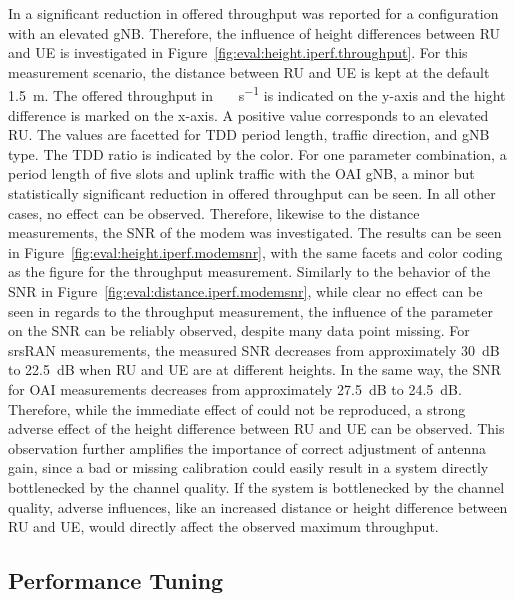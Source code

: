 In \cite{raffeck2024parameterizing} a significant reduction in offered throughput was reported for a configuration with an elevated \gls{gNB}.
Therefore, the influence of height differences between \gls{RU} and \gls{UE} is investigated in Figure~\ref{fig:eval:height.iperf.throughput}.
For this measurement scenario, the distance between \gls{RU} and \gls{UE} is kept at the default \SI{1.5}{\meter}.
The offered throughput in \SI{}{\mega\bit\per\second} is indicated on the y-axis and the hight difference is marked on the x-axis.
A positive value corresponds to an elevated \gls{RU}.
The values are facetted for \gls{TDD} period length, traffic direction, and \gls{gNB} type.
The \gls{TDD} ratio is indicated by the color.
For one parameter combination, a period length of five slots and uplink traffic with the OAI \gls{gNB},
a minor but statistically significant reduction in offered throughput can be seen.
In all other cases, no effect can be observed.
Therefore, likewise to the distance measurements, the \gls{SNR} of the modem was investigated.
The results can be seen in Figure~\ref{fig:eval:height.iperf.modemsnr}, with the same facets and color coding as the figure for the throughput measurement.
Similarly to the behavior of the \gls{SNR} in Figure~\ref{fig:eval:distance.iperf.modemsnr},
while clear no effect can be seen in regards to the throughput measurement,
the influence of the parameter on the \gls{SNR} can be reliably observed, despite many data point missing.
For srsRAN measurements, the measured \gls{SNR} decreases from approximately \SI{30}{\deci\bel} to \SI{22.5}{\deci\bel} when \gls{RU} and \gls{UE} are at different heights.
In the same way, the \gls{SNR} for OAI measurements decreases from approximately \SI{27.5}{\deci\bel} to \SI{24.5}{\deci\bel}.
Therefore, while the immediate effect of \cite{raffeck2024parameterizing} could not be reproduced, a strong adverse effect of the
height difference between \gls{RU} and \gls{UE} can be observed.
This observation further amplifies the importance of correct adjustment of antenna gain,
since a bad or missing calibration could easily result in a system directly bottlenecked by the channel quality.
If the system is bottlenecked by the channel quality, adverse influences, like an increased distance or height difference
between \gls{RU} and \gls{UE}, would directly affect the observed maximum throughput.



\subsection{Performance Tuning}\label{sec:eval:perftuning}

